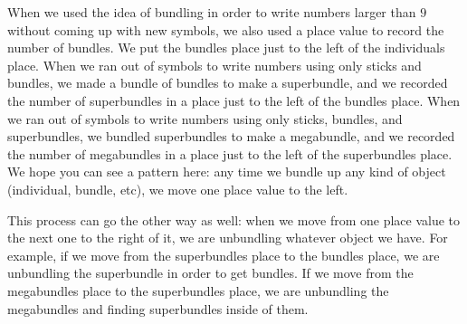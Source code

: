 \documentclass{ximera}
\begin{document}
When we used the idea of bundling in order to write numbers larger than $9$ without coming up with new symbols, we also used a place value to record the number of bundles. We put the bundles place just to the left of the individuals place. When we ran out of symbols to write numbers using only sticks and bundles, we made a bundle of bundles to make a superbundle, and we recorded the number of superbundles in a place just to the left of the bundles place. When we ran out of symbols to write numbers using only sticks, bundles, and superbundles, we bundled superbundles to make a megabundle, and we recorded the number of megabundles in a place just to the left of the superbundles place.  We hope you can see a pattern here: any time we bundle up any kind of object (individual, bundle, etc), we move one place value to the left. %

\begin{image}
\end{image}

This process can go the other way as well: when we move from one place value to the next one to the right of it, we are unbundling whatever object we have. For example, if we move from the superbundles place to the bundles place, we are unbundling the superbundle in order to get bundles. If we move from the megabundles place to the superbundles place, we are unbundling the megabundles and finding superbundles inside of them. 

\begin{image}
\end{image}
\end{document}

